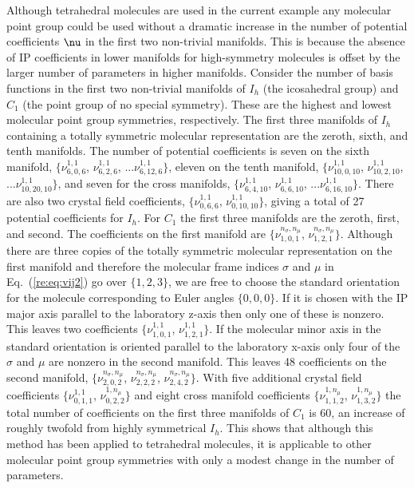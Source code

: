 \documentclass[preprint]{iucr}              %
\newcommand{\mb}[1]{\ensuremath{\mbox{\boldmath $ #1 $}}}
\begin{document}
Although tetrahedral molecules are used in the current example any molecular
point group could be used
without a dramatic increase in the number of potential coefficients
$\mb{\nu}$ in the first two non-trivial manifolds. This is because
the absence of IP coefficients in lower manifolds for high-symmetry
molecules is offset by the larger number of parameters in higher
manifolds. Consider the number of basis functions in the first two
non-trivial manifolds of $I_h$
(the icosahedral group) and $C_1$ (the point group of no special symmetry).
These are the
highest and lowest molecular point group symmetries, respectively.
The first three manifolds of $I_h$ containing a totally symmetric
molecular representation are the zeroth, sixth, and tenth manifolds.
The number of potential coefficients is seven on the sixth manifold,
$\{\nu_{6,0,6}^{1,1}$, $\nu_{6,2,6}^{1,1}$,
...$\nu_{6,12,6}^{1,1}\}$, eleven on the tenth manifold,
$\{\nu_{10,0,10}^{1,1}$, $\nu_{10,2,10}^{1,1}$,
...$\nu_{10,20,10}^{1,1}\}$, and seven for the cross manifolds,
$\{\nu_{6,4,10}^{1,1}$, $\nu_{6,6,10}^{1,1}$,
...$\nu_{6,16,10}^{1,1}\}$.  There are also two crystal field
coefficients, $\{\nu_{0,6,6}^{1,1}$, $\nu_{0,10,10}^{1,1}\}$, giving
a total of 27 potential coefficients for $I_h$.  For $C_1$ the first
three manifolds are the zeroth, first, and second. The coefficients
on the first manifold are $\{\nu_{1,0,1}^{n_\sigma,n_\mu}$,
$\nu_{1,2,1}^{n_\sigma,n_\mu}\}$. Although there are three copies of
the totally symmetric molecular representation on the first manifold
and therefore the molecular frame indices $\sigma$ and $\mu$ in
Eq.~(\ref{re:eq:vij2}) go over $\{1,2,3\}$, we are free to choose the
standard orientation for the molecule corresponding to Euler angles
$\{0,0,0\}$.  If it is chosen with the IP major axis parallel to the
laboratory z-axis then only one of these is nonzero. This leaves two
coefficients $\{\nu_{1,0,1}^{1,1}$, $\nu_{1,2,1}^{1,1}\}$. If the
molecular minor axis in the standard orientation is oriented
parallel to the laboratory x-axis only four of the $\sigma$ and
$\mu$ are nonzero in the second manifold. This leaves 48
coefficients on the second manifold,
$\{\nu_{2,0,2}^{n_\sigma,n_\mu}$, $\nu_{2,2,2}^{n_\sigma,n_\mu}$,
$\nu_{2,4,2}^{n_\sigma,n_\mu}\}$. With five additional crystal field
coefficients $\{\nu^{1,1}_{0,1,1}$, $\nu^{1,n_\mu}_{0,2,2}\}$ and
eight cross manifold coefficients $\{\nu^{1,n_\mu}_{1,1,2}$,
$\nu^{1,n_\mu}_{1,3,2}\}$ the total number of coefficients on the
first three manifolds of $C_1$ is 60, an increase of roughly twofold
from highly symmetrical $I_h$. This shows that although this method
has been applied to tetrahedral molecules, it is applicable to other
molecular point group symmetries with only a modest change in the
number of parameters.
\end{document}
